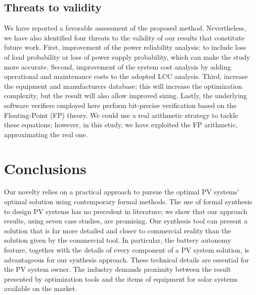 \documentclass[runningheads]{llncs}
\begin{document}
\subsection{Threats to validity} 

We have reported a favorable assessment of the proposed method. Nevertheless, we have also identified four threats to the validity of our results that constitute future work. First, improvement of the power reliability analysis: to include loss of load probability or loss of power supply probability, which can make the study more accurate. Second, improvement of the system cost analysis by adding operational and maintenance costs to the adopted LCC analysis. Third, increase the equipment and manufacturers database: this will increase the optimization complexity, but the result will also allow improved sizing. Lastly, the underlying software verifiers employed here perform bit-precise verification based on the Floating-Point (FP) theory. We could use a real arithmetic strategy to tackle these equations; however, in this study, we have exploited the FP arithmetic, approximating the real one. 

\section{Conclusions} 

Our novelty relies on a practical approach to pursue the optimal PV systems' optimal solution using contemporary formal methods. The use of formal synthesis to design PV systems has no precedent in literature; we show that our approach results, using seven case studies, are promising. Our synthesis tool can present a solution that is far more detailed and closer to commercial reality than the solution given by the commercial tool. In particular, the battery autonomy feature, together with the details of every component of a PV system solution, is advantageous for our synthesis approach. These technical details are essential for the PV system owner. The industry demands proximity between the result presented by optimization tools and the items of equipment for solar systems available on the market. 
\end{document}
